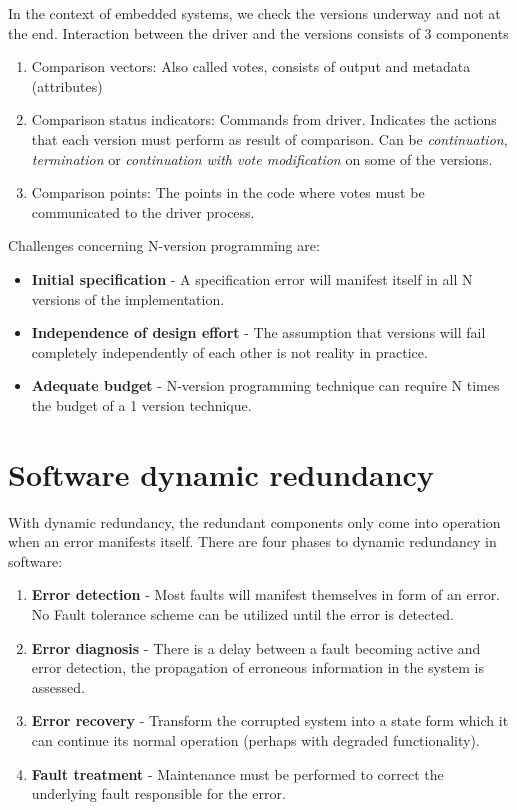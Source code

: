 In the context of embedded systems, we check the versions underway and not at the end. Interaction between the driver and the versions consists of 3 components
\begin{enumerate}
\item Comparison vectors: Also called votes, consists of output and metadata (attributes)
\item Comparison status indicators: Commands from driver. Indicates the actions that each version must perform as result of comparison. Can be \textit{continuation}, \textit{termination} or \textit{continuation with vote modification} on some of the versions.
\item Comparison points: The points in the code where votes must be communicated to the driver process.
\end{enumerate}

Challenges concerning N-version programming are:
\begin{itemize}
\item \textbf{Initial specification} - A specification error will manifest itself in all N versions of the implementation.
\item \textbf{Independence of design effort} - The assumption that versions will fail completely independently of each other is not reality in practice.
\item \textbf{Adequate budget} - N-version programming technique can require N times the budget of a 1 version technique.
\end{itemize}

\section{Software dynamic redundancy}
With dynamic redundancy, the redundant components only come into operation when an error manifests itself. There are four phases to dynamic redundancy in software:
\begin{enumerate}
\item \textbf{Error detection} - Most faults will manifest themselves in form of an error. No Fault tolerance scheme can be utilized until the error is detected.
\item \textbf{Error diagnosis} - There is a delay between a fault becoming active and error detection, the propagation of erroneous information in the system is assessed.
\item \textbf{Error recovery} - Transform the corrupted system into a state form which it can continue its normal operation (perhaps with degraded functionality).
\item \textbf{Fault treatment} - Maintenance must be performed to correct the underlying fault responsible for the error.

\end{enumerate}

